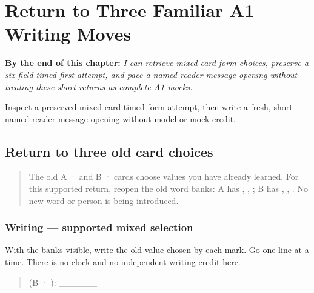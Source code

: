 
\chapter{Return to Three Familiar A1 Writing Moves}
\label{ch:pa-three-familiar-a1-writing-moves}

\begin{chapteropening}
\textbf{By the end of this chapter:} \emph{I can retrieve mixed-card form choices, preserve a six-field timed first attempt, and pace a named-reader message opening without treating these short returns as complete A1 mocks.}

Inspect a preserved mixed-card timed form attempt, then write a fresh, short named-reader message opening without model or mock credit.
\end{chapteropening}

\section[\texorpdfstring{\pa{ਨਾਂ}: · \pa{ਭਾਸ਼ਾ} … (return to three …)}{ਨਾਂ: · ਭਾਸ਼ਾ … (return to three …)}]{Return to three old card choices}

\label{lesson:PA-W16-form-mixed-return}



\begin{quote}
The old A ·  and B ·  cards choose values you have already learned. For this supported return, reopen the old word banks: A has \textbf{}, \textbf{}, \textbf{}; B has \textbf{}, \textbf{}, \textbf{}. No new word or person is being introduced.
\end{quote}

\subsection*{Writing — supported mixed selection}
With the banks visible, write the old value chosen by each mark. Go one line at a time. There is no clock and no independent-writing credit here.

\begin{quote}
 (B · ): \_\_\_\_\_\_
\end{quote}

